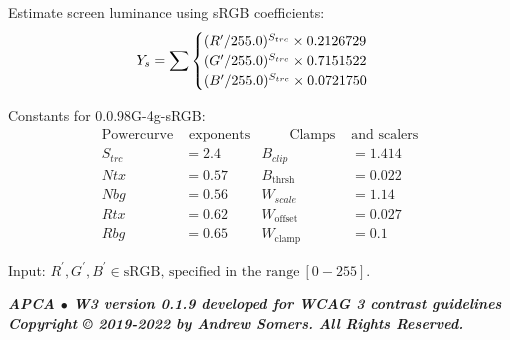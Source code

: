 \documentclass[a4paper,12pt]{article}
\begin{document}
\vspace*{2ex} \noindent
Estimate screen luminance using sRGB coefficients:
\begin{equation*}
  Y_s = \sum
  \begin{cases}
    { %
      (R^\prime / 255.0)^{S_{trc}} \times 0.2126729}\\
    { %
      (G^\prime / 255.0)^{S_{trc}} \times 0.7151522}\\
    { %
      (B^\prime / 255.0)^{S_{trc}} \times 0.0721750}
  \end{cases}
\end{equation*}

\vspace*{2ex} \noindent
Constants for 0.0.98G-4g-sRGB:
\begin{equation*}
  \begin{aligned}
    \text{Powercurve} &\text{~exponents}
    &\qquad \text{Clamps~} &\text{and scalers}\\
    S_{trc} &= 2.4   &B_{clip}        &= 1.414 \\
    Ntx     &= 0.57  &B_\text{thrsh}  &= 0.022 \\
    Nbg     &= 0.56  &W_{scale}       &= 1.14 \\
    Rtx     &= 0.62  &W_\text{offset} &= 0.027 \\
    Rbg     &= 0.65  &W_\text{clamp}  &= 0.1
  \end{aligned}
\end{equation*}

\vspace*{2ex} \noindent
Input: $R^\prime, G^\prime, B^\prime \in \text{sRGB, specified in the
range}~[0-255].$

\vfill
\begin{center}
  \bfseries \itshape
  APCA $\bullet$ W3 version 0.1.9 developed for WCAG 3 contrast
  guidelines\\
  Copyright © 2019-2022 by Andrew Somers. All Rights Reserved.
\end{center}
\end{document}
